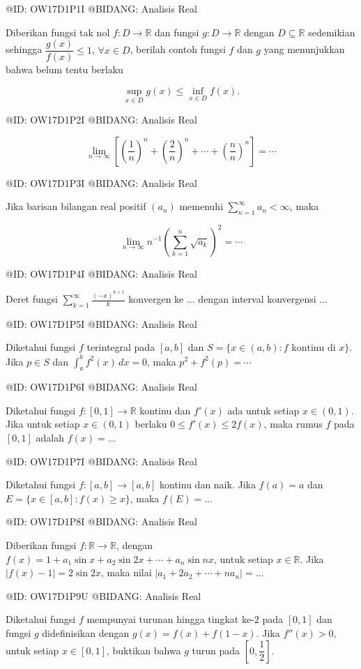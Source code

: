@ID: OW17D1P1I
@BIDANG: Analisis Real

Diberikan fungsi tak nol $f:D\to\mathbb R$ dan fungsi $g:D\to\mathbb R$ dengan $D\subseteq\mathbb R$ sedemikian sehingga $\dfrac{g(x)}{f(x)}\leq 1$, $\forall x\in D$, berilah contoh fungsi $f$ dan $g$ yang menunjukkan bahwa belum tentu berlaku

$$
\sup_{x\in D} g(x)\leq \inf_{x\in D} f(x).
$$

@ID: OW17D1P2I
@BIDANG: Analisis Real

$$
\lim_{n\to\infty}\left[\left(\frac1n\right)^n+\left(\frac2n\right)^n+\cdots+\left(\frac nn\right)^n\right]=\cdots
$$

@ID: OW17D1P3I
@BIDANG: Analisis Real

Jika barisan bilangan real positif $(a_n)$ memenuhi $\displaystyle\sum_{n=1}^{\infty} a_n<\infty$, maka

$$
\lim_{n\to\infty} n^{-1}\left(\sum_{k=1}^n \sqrt{a_k}\right)^2=\cdots
$$

@ID: OW17D1P4I
@BIDANG: Analisis Real

Deret fungsi $\displaystyle\sum_{k=1}^{\infty}\frac{(-x)^{k+1}}{k}$ konvergen ke $\ldots$ dengan interval konvergensi $\ldots$

@ID: OW17D1P5I
@BIDANG: Analisis Real

Diketahui fungsi $f$ terintegral pada $[a,b]$ dan $S=\{x\in(a,b):f \text{ kontinu di } x\}$. Jika $p\in S$ dan $\displaystyle\int_a^b f^2(x)\,dx=0$, maka $p^2+f^2(p)=\cdots$

@ID: OW17D1P6I
@BIDANG: Analisis Real

Diketahui fungsi $f:[0,1]\to\mathbb R$ kontinu dan $f'(x)$ ada untuk setiap $x\in(0,1)$. Jika untuk setiap $x\in(0,1)$ berlaku $0\leq f'(x)\leq 2f(x)$, maka rumus $f$ pada $[0,1]$ adalah $f(x)=\ldots$

@ID: OW17D1P7I
@BIDANG: Analisis Real

Diketahui fungsi $f:[a,b]\to[a,b]$ kontinu dan naik. Jika $f(a)=a$ dan $E=\{x\in[a,b]:f(x)\geq x\}$, maka $f(E)=\ldots$

@ID: OW17D1P8I
@BIDANG: Analisis Real

Diberikan fungsi $f:\mathbb R\to\mathbb R$, dengan $f(x)=1+a_1\sin x+a_2\sin 2x+\cdots+a_n\sin nx$, untuk setiap $x\in\mathbb R$. Jika $|f(x)-1|=2\sin 2x$, maka nilai $|a_1+2a_2+\cdots+na_n|=\ldots$

@ID: OW17D1P9U
@BIDANG: Analisis Real

Diketahui fungsi $f$ mempunyai turunan hingga tingkat ke-$2$ pada $[0,1]$ dan fungsi $g$ didefinisikan dengan $g(x)=f(x)+f(1-x)$. Jika $f''(x)>0$, untuk setiap $x\in[0,1]$, buktikan bahwa $g$ turun pada $\left[0,\dfrac12\right]$.

